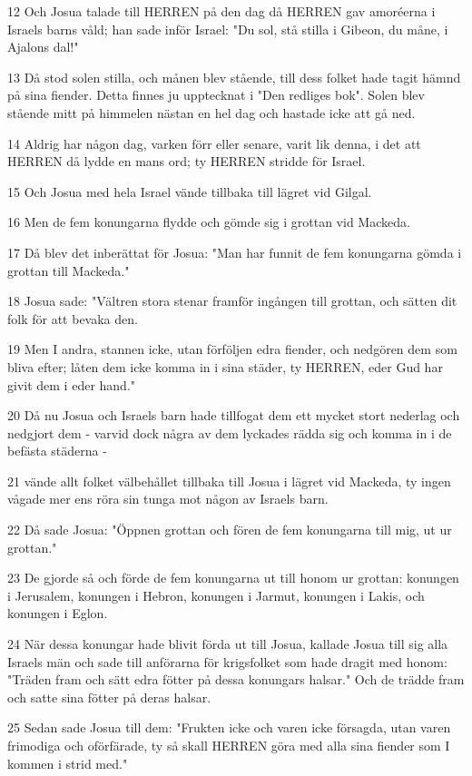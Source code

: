 \par 12 Och Josua talade till HERREN på den dag då HERREN gav amoréerna i Israels barns våld; han sade inför Israel: "Du sol, stå stilla i Gibeon, du måne, i Ajalons dal!"
\par 13 Då stod solen stilla, och månen blev stående, till dess folket hade tagit hämnd på sina fiender. Detta finnes ju upptecknat i "Den redliges bok". Solen blev stående mitt på himmelen nästan en hel dag och hastade icke att gå ned.
\par 14 Aldrig har någon dag, varken förr eller senare, varit lik denna, i det att HERREN då lydde en mans ord; ty HERREN stridde för Israel.
\par 15 Och Josua med hela Israel vände tillbaka till lägret vid Gilgal.
\par 16 Men de fem konungarna flydde och gömde sig i grottan vid Mackeda.
\par 17 Då blev det inberättat för Josua: "Man har funnit de fem konungarna gömda i grottan till Mackeda."
\par 18 Josua sade: "Vältren stora stenar framför ingången till grottan, och sätten dit folk för att bevaka den.
\par 19 Men I andra, stannen icke, utan förföljen edra fiender, och nedgören dem som bliva efter; låten dem icke komma in i sina städer, ty HERREN, eder Gud har givit dem i eder hand."
\par 20 Då nu Josua och Israels barn hade tillfogat dem ett mycket stort nederlag och nedgjort dem - varvid dock några av dem lyckades rädda sig och komma in i de befästa städerna -
\par 21 vände allt folket välbehållet tillbaka till Josua i lägret vid Mackeda, ty ingen vågade mer ens röra sin tunga mot någon av Israels barn.
\par 22 Då sade Josua: "Öppnen grottan och fören de fem konungarna till mig, ut ur grottan."
\par 23 De gjorde så och förde de fem konungarna ut till honom ur grottan: konungen i Jerusalem, konungen i Hebron, konungen i Jarmut, konungen i Lakis, och konungen i Eglon.
\par 24 När dessa konungar hade blivit förda ut till Josua, kallade Josua till sig alla Israels män och sade till anförarna för krigsfolket som hade dragit med honom: "Träden fram och sätt edra fötter på dessa konungars halsar." Och de trädde fram och satte sina fötter på deras halsar.
\par 25 Sedan sade Josua till dem: "Frukten icke och varen icke försagda, utan varen frimodiga och oförfärade, ty så skall HERREN göra med alla sina fiender som I kommen i strid med."
